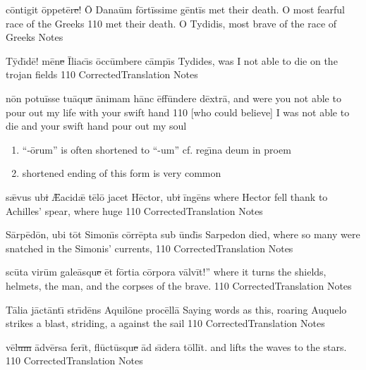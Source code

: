 \latline
  {c\=ont\-ig\-it \=opp\-et\=er\sout{e}!  \={\macron O} D\-an\-a\=um f\=ort\=iss\-im\-e g\=ent\=is}
  { met their death.  O most fearful race of the Greeks }
  {110}
  { met their death.  O Tydidis, most brave of the race of Greeks }
  { Notes }


\latline
  {T\={\macron y}d\={\macron \i}d\={\macron e}!  m\={\macron e}n\sout{e }\={\macron I}l\-i\-ac\={\macron \i}s \=occ\=umb\-er\-e c\=amp\={\macron \i}s}
  { Tydides, was I not able to die on the trojan fields }
  {110}
  { CorrectedTranslation }
  { Notes }


\newpage

\latline
  {n\={\macron o}n p\-ot\-u\=iss\-e t\-u\={\macron a}qu\sout{e }\=an\-im\-am h\=anc \=eff\=und\-er\-e d\=extr\={\macron a},}
  { and were you not able to pour out my life with your swift hand }
  {110}
  { [who could believe] I was not able to die and your swift hand pour out my soul }
  { \begin{enumerate}
  	\item ``-\={o}rum'' is often shortened to ``-um'' cf. reg\={\i}na deum in proem
  	\item shortened ending of this form is very common
  \end{enumerate} }


\latline
  {s\={\ae}v\-us \-ub\sout{i }\={\AE}a\-c\-id\={\ae} t\={\macron e}l\={\macron o} j\-ac\-et H\=ect\-or, \-ub\sout{i }\=ing\={\macron e}ns}
  { where Hector fell thank to Achilles' spear, where huge }
  {110}
  { CorrectedTranslation }
  { Notes }


\latline
  {S\=arp\={\macron e}d\={\macron o}n, \-ub\-i t\=ot S\-im\-on\={\macron \i}s c\=orr\=ept\-a s\-ub \=und\={\macron \i}s}
  { Sarpedon died, where so many were snatched in the Simonis' currents,  }
  {110}
  { CorrectedTranslation }
  { Notes }


\newpage

\latline
  {sc\={\macron u}t\-a v\-ir\=um g\-al\-e\={\macron a}squ\sout{e }\=et f\=ort\-i\-a c\=orp\-or\-a v\=alv\=it!''}
  { where it turns the shields, helmets, the man, and the corpses of the brave. }
  {110}
  { CorrectedTranslation }
  { Notes }


\latline
  {T\={\macron a}l\-i\-a j\=act\=ant\={\macron \i} str\={\macron \i}d\={\macron e}ns \-Aqu\-il\={\macron o}n\-e pr\-oc\=ell\=a}
  { Saying words as this, roaring Auquelo strikes a blast, striding, a against the sail }
  {110}
  { CorrectedTranslation }
  { Notes }


\latline
  {v\={\macron e}l\sout{um }\=adv\=ers\-a f\-er\=it, fl\={\macron u}ct\={\macron u}squ\sout{e }\=ad s\={\macron \i}d\-er\-a t\=oll\=it.}
  {  and lifts the waves to the stars. }
  {110}
  { CorrectedTranslation }
  { Notes }


